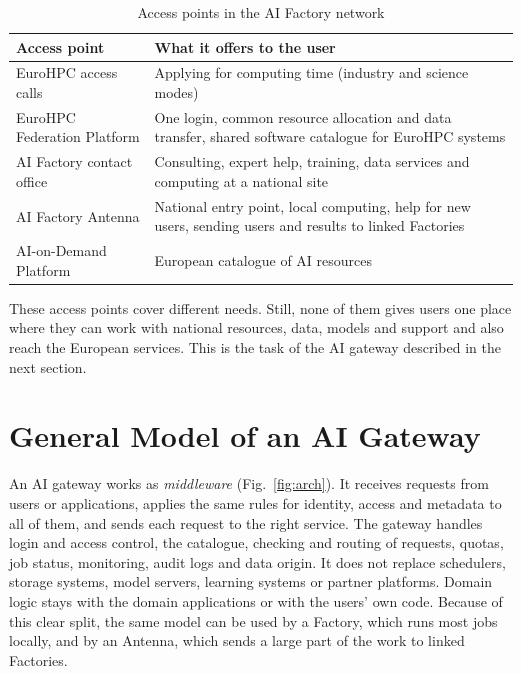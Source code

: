 \documentclass[conference,a4paper]{IEEEtran}
\begin{document}
\begin{table}[!h]
\centering
\caption{Access points in the AI Factory network}
\label{tab:landscape}
\footnotesize
\renewcommand{\arraystretch}{1.1}
\begin{tabular}{@{}p{2.25cm}p{5.75cm}@{}}
\toprule
\textbf{Access point} & \textbf{What it offers to the user} \\
\midrule
EuroHPC access calls & Applying for computing time (industry and science modes) \\
EuroHPC Federation Platform & One login, common resource allocation and data transfer, shared software catalogue for EuroHPC systems \\
AI Factory contact office & Consulting, expert help, training, data services and computing at a national site \\
AI Factory Antenna & National entry point, local computing, help for new users, sending users and results to linked Factories \\
AI-on-Demand Platform & European catalogue of AI resources \\
\bottomrule
\end{tabular}
\end{table}

These access points cover different needs. Still, none of them gives users one place where they can work with national resources, data, models and support and also reach the European services. This is the task of the AI gateway described in the next section.

\section{General Model of an AI Gateway}

An AI gateway works as \emph{middleware} (Fig.~\ref{fig:arch}). It receives requests from users or applications, applies the same rules for identity, access and metadata to all of them, and sends each request to the right service. The gateway handles login and access control, the catalogue, checking and routing of requests, quotas, job status, monitoring, audit logs and data origin. It does not replace schedulers, storage systems, model servers, learning systems or partner platforms. Domain logic stays with the domain applications or with the users' own code. Because of this clear split, the same model can be used by a Factory, which runs most jobs locally, and by an Antenna, which sends a large part of the work to linked Factories.
\end{document}
